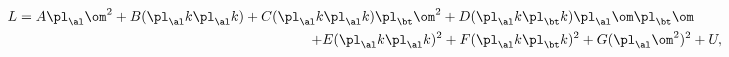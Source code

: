 \begin{equation}                                        \label{elagep}
\begin{split}
  L=A\pl_\al\om^2+B(\pl_\al k\pl_\al k)
  +C(\pl_\al k\pl_\al k)\pl_\bt\om^2
  +D&(\pl_\al k\pl_\bt k)\pl_\al\om\pl_\bt\om
\\
  +E(\pl_\al k\pl_\al k)^2+F&(\pl_\al k\pl_\bt k)^2+G(\pl_\al\om^2)^2+U,
\end{split}
\end{equation}

